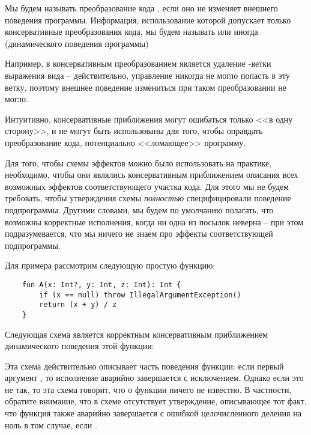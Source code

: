 \begin{definition}
    Мы будем называть преобразование кода , если оно не изменяет внешнего поведения программы. Информация, использование которой допускает только консервативные преобразования кода, мы будем называть  или иногда  (динамического поведения программы)
\end{definition}

Например, в  консервативным преобразованием является удаление -ветки выражения вида  -- действительно, управление никогда не могло попасть в эту ветку, поэтому внешнее поведение измениться при таком преобразовании не могло.

Интуитивно, консервативные приближения могут ошибаться только <<в одну сторону>>, и не могут быть использованы для того, чтобы оправдать преобразование кода, потенциально <<ломающее>> программу. 

Для того, чтобы схемы эффектов можно было использовать на практике, необходимо, чтобы они являлись консервативным приближением описания всех возможных эффектов соответствующего участка кода. Для этого мы не будем требовать, чтобы утверждения схемы \emph{полностью} специфицировали поведение подпрограммы. Другими словами, мы будем по умолчанию полагать, что возможны корректные исполнения, когда ни одна из посылок неверна -- при этом подразумевается, что мы ничего не знаем про эффекты соответствующей подпрограммы. 

Для примера рассмотрим следующую простую функцию:

\begin{verbatim}
    fun A(x: Int?, y: Int, z: Int): Int {
        if (x == null) throw IllegalArgumentException()
        return (x + y) / z
    }
\end{verbatim}

Следующая схема является корректным консервативным приближением динамического поведения этой функции:


Эта схема действительно описывает часть поведения функции: если первый аргумент , то исполнение аварийно завершается с исключением. Однако если это не так, то эта схема говорит, что о функции ничего не известно. В частности, обратите внимание, что в схеме отсутствует утверждение, описывающее тот факт, что функция также аварийно завершается с ошибкой целочисленного деления на ноль в том случае, если .

